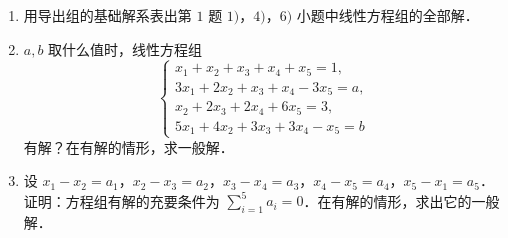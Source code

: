 \begin{enumerate}
\begin{enumerate}
\[      \begin{cases}
        x_1+x_2+x_3+x_4+x_5=0,\\
        3x_1+2x_2+x_3+x_4-3x_5=0,\\
        x_2+2x_3+2x_4+6x_5=0,\\
        5x_1+4x_2+3x_3+3x_4-x_5=0;
      \end{cases}
    \]
  \anssub
    \item \[
      \begin{cases}
        x_1+x_2-3x_4-x_5=0,\\
        x_1-x_2+2x_3-x_4=0,\\
        4x_1-2x_2+6x_3+3x_4-4x_5=0,\\
        2x_1+4x_2-2x_3+4x_4-7x_5=0;
      \end{cases}
    \]
  \anssub
    \item \[
      \begin{cases}
        x_1-2x_2+x_3+x_4-x_5=0,\\
        2x_1+x_2-x_3-x_4-x_5=0,\\
        x_1+7x_2-5x_3-5x_4+5x_5=0,\\
        3x_1-x_2-2x_3+x_4-x_5=0;
      \end{cases}
    \]
  \anssub
    \item \[
      \begin{cases}
        x_1-2x_2+x_3-x_4+x_5=0,\\
        2x_1+x_2-x_3+2x_4-3x_5=0,\\
        3x_1-2x_2-x_3+x_4-2x_5=0,\\
        2x_1-5x_2+x_3-2x_4+2x_5=0.
      \end{cases}
    \]
  \anssub
  \end{enumerate}
  \item 用导出组的基础解系表出第 $1$ 题 $1)$，$4)$，$6)$ 小题中线性方程组的全部解．
  \anscompute
  \item $a,b$ 取什么值时，线性方程组
  \[
    \begin{cases}
      x_1+x_2+x_3+x_4+x_5=1,\\
      3x_1+2x_2+x_3+x_4-3x_5=a,\\
      x_2+2x_3+2x_4+6x_5=3,\\
      5x_1+4x_2+3x_3+3x_4-x_5=b
    \end{cases}
  \]
  有解？在有解的情形，求一般解．
  \anscompute
  \item 设 $x_1-x_2=a_1$，$x_2-x_3=a_2$，$x_3-x_4=a_3$，$x_4-x_5=a_4$，$x_5-x_1=a_5$．证明：方程组有解的充要条件为 $\sum\limits_{i=1}^{5}a_i=0$．在有解的情形，求出它的一般解．

\end{enumerate}
